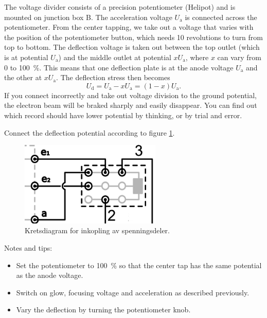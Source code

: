 \documentclass[../Elmag-labhefte-2020.tex]{subfiles}
\begin{document}
The voltage divider consists of a precision potentiometer (Helipot) and is mounted on junction box B. The acceleration voltage $U_\mathrm{a}$ is connected across the potentiometer. From the center tapping, we take out a voltage that varies with the position of the potentiometer button, which needs 10 revolutions to turn from top to bottom. The deflection voltage is taken out between the top outlet (which is at potential $U_\mathrm{a}$) and the middle outlet at potential $x  U_\mathrm{a}$, where $x$ can vary from 0 to \SI{100}{\percent}. This means that one deflection plate is at the anode voltage $U_\mathrm{a}$ and the other at $x  U_\mathrm{a}$. The deflection stress then becomes
\begin{equation}
    U_\mathrm{d} 
        = U_\mathrm{a} - x U_\mathrm{a} 
        = (1 - x) U_\mathrm{a}.
\end{equation}
If you connect incorrectly and take out voltage division to the ground potential, the electron beam will be braked sharply and easily disappear. You can find out which record should have lower potential by thinking, or by trial and error.

{\itsf Connect the deflection potential according to figure \ref{fig:spenningsdeler}.}
 
\begin{figure}[!ht]
    \begin{center}
    \includegraphics[width=0.6\textwidth]{fig/spenningsdeler-new.pdf}
    \caption{%
        Kretsdiagram for inkopling av spenningsdeler.
    }
    \label{fig:spenningsdeler}
    \end{center}
\end{figure}

Notes and tips:
\vspace{-4mm}
\begin{itemize}
    \item Set the potentiometer to \SI{100}{\percent} so that the center tap has the same potential as the anode voltage.
    \item Switch on glow, focusing voltage and acceleration as described previously.
    \item Vary the deflection by turning the potentiometer knob.
\end{itemize}
\end{document}

